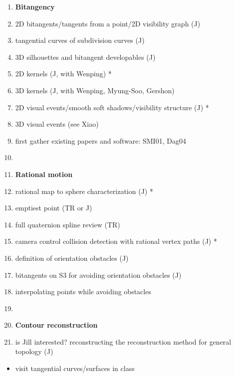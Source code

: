 \documentclass[12pt]{article}
\begin{document}
\begin{enumerate}
\item {\bf Bitangency}
\item 2D bitangents/tangents from a point/2D visibility graph (J)
\item tangential curves of subdivision curves (J)
\item 3D silhouettes and bitangent developables (J)
\item 2D kernels (J, with Wenping)                                      *
\item 3D kernels (J, with Wenping, Myung-Soo, Gershon)
\item 2D visual events/smooth soft shadows/visibility structure (J)     *
\item 3D visual events (see Xiao)
\item first gather existing papers and software: SMI01, Dag04
\item
\item {\bf Rational motion}
\item rational map to sphere characterization (J)                       *
\item emptiest point (TR or J)
\item full quaternion spline review (TR)
\item camera control collision detection with rational vertex paths (J) *
\item definition of orientation obstacles (J)
\item bitangents on S3 for avoiding orientation obstacles (J)
\item interpolating points while avoiding obstacles
\item
\item {\bf Contour reconstruction}
\item is Jill interested? reconstructing the reconstruction method for general topology (J)
\end{enumerate}

\begin{itemize}
\item visit tangential curves/surfaces in class
\end{itemize}
\end{document}
